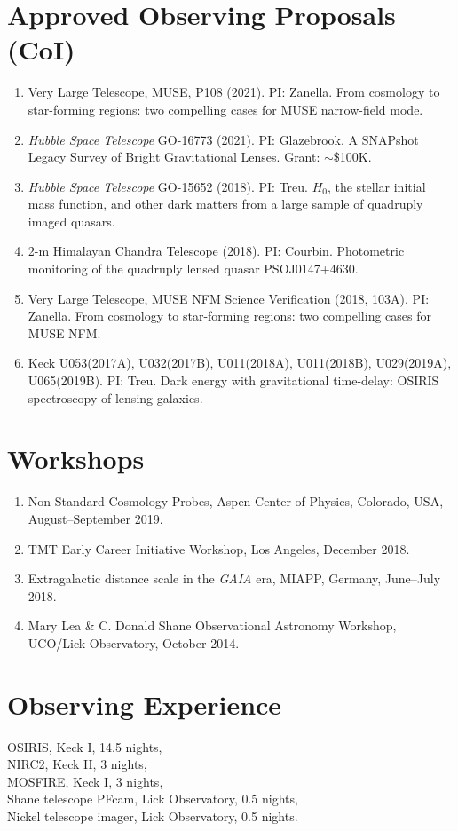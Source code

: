 \documentclass[margin, line]{res}
\begin{document}
\begin{resume}
\section{\sc Approved Observing Proposals (CoI)}
\begin{enumerate}
\item Very Large Telescope, MUSE, P108 (2021). PI: Zanella. From cosmology to star-forming regions: two compelling cases for MUSE narrow-field mode.
\item \textit{Hubble Space Telescope} GO-16773 (2021). PI: Glazebrook. A SNAPshot Legacy Survey of Bright Gravitational Lenses. Grant: $\sim$\$100K.
\item \textit{Hubble Space Telescope} GO-15652 (2018). PI: Treu. $H_0$, the stellar initial mass function, and other dark matters from a large sample of quadruply imaged quasars.
\item 2-m Himalayan Chandra Telescope (2018). PI: Courbin. Photometric monitoring of the quadruply lensed quasar PSOJ0147+4630.
\item Very Large Telescope, MUSE NFM Science Verification (2018, 103A). PI: Zanella. From cosmology to star-forming regions: two compelling cases for MUSE NFM.
\item Keck U053(2017A), U032(2017B), U011(2018A),  U011(2018B), U029(2019A), U065(2019B). PI: Treu. Dark energy with gravitational time-delay: OSIRIS spectroscopy of lensing galaxies.
\end{enumerate}


\section{\sc Workshops}
\begin{enumerate}
	\item Non-Standard Cosmology Probes, Aspen Center of Physics, Colorado, USA, August--September 2019.
	\item TMT Early Career Initiative Workshop, Los Angeles, December 2018.
	\item Extragalactic distance scale in the \textit{GAIA} era, MIAPP, Germany, June--July 2018.
	\item Mary Lea \& C. Donald Shane Observational Astronomy Workshop, UCO/Lick Observatory, October 2014.
\end{enumerate}

\section{\sc Observing Experience}
OSIRIS, Keck I, 14.5 nights,\\
NIRC2, Keck II, 3 nights, \\
MOSFIRE, Keck I, 3 nights, \\
Shane telescope PFcam, Lick Observatory, 0.5 nights, \\
Nickel telescope imager, Lick Observatory, 0.5 nights.



\end{resume}
\end{document}
